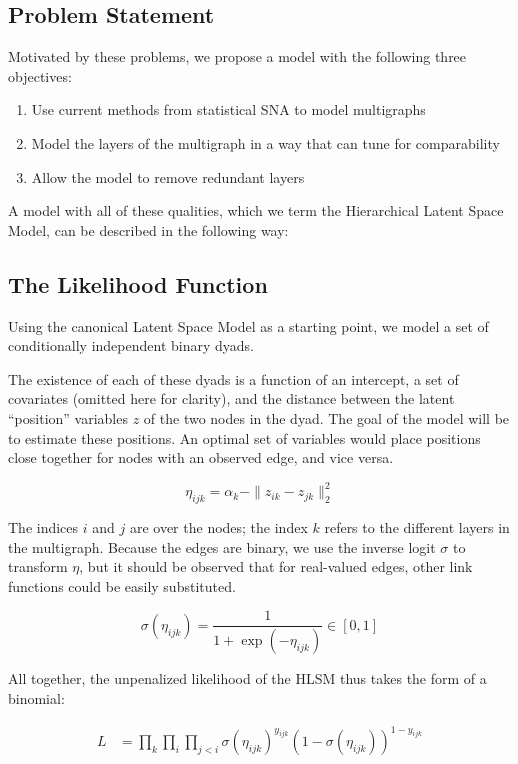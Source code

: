 \documentclass{article}
\begin{document}
\subsection{Problem Statement}
Motivated by these problems, we propose a model with the following three objectives:

\begin{enumerate}
\item Use current methods from statistical SNA to model multigraphs
\item Model the layers of the multigraph in a way that can tune for comparability
\item Allow the model to remove redundant layers
\end{enumerate}

A model with all of these qualities, which we term the Hierarchical Latent Space Model, can be described in the following way:

\subsection{The Likelihood Function}
Using the canonical Latent Space Model \cite{Hoff2002} as a starting point, we model a set of conditionally independent binary dyads. 

The existence of each of these dyads is a function of an intercept, a set of covariates (omitted here for clarity), and the distance between the latent ``position'' variables $z$ of the two nodes in the dyad. The goal of the model will be to estimate these positions. An optimal set of variables would place positions close together for nodes with an observed edge, and vice versa.

\[
\eta_{ijk} = \alpha_k - \|z_{ik} - z_{jk}\|_2^2 %
\]

The indices $i$ and $j$ are over the nodes; the index $k$ refers to the different layers in the multigraph. Because the edges are binary, we use the inverse logit $\sigma$ to transform $\eta$, but it should be observed that for real-valued edges, other link functions could be easily substituted.

\[
\sigma(\eta_{ijk}) = \frac{1}{1+\exp(-\eta_{ijk})} \in [0, 1]
\]

All together, the unpenalized likelihood of the HLSM thus takes the form of a binomial:

\begin{align*}
  L &= \prod_k \prod_{i}\prod_{j<i} \sigma(\eta_{ijk})^{y_{ijk}}(1-\sigma(\eta_{ijk}))^{1-y_{ijk}}
\end{align*}
\end{document}
